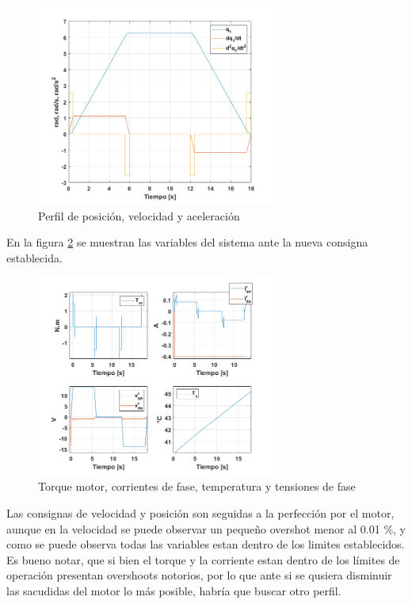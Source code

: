 \documentclass[10pt]{article}
\begin{document}
\begin{itemize}
 \begin{figure}[h!]
	\centering
	\includegraphics[width=0.7\textwidth]{consignasnuevas.png}
	\caption{\label{fig:consignasnuevas}Perfil de posición, velocidad y aceleración}
	\end{figure}

	En la figura \ref{fig:consignanuevapara} se muestran las variables del sistema ante la nueva consigna establecida.

	\begin{figure}[h!]
		\centering
		\includegraphics[width=0.7\textwidth]{consignanuevapara.png}
		\caption{\label{fig:consignanuevapara}Torque motor, corrientes de fase, temperatura y tensiones de fase}
		\end{figure}

	Las consignas de velocidad y posición son seguidas a la perfección por el motor, aunque en la velocidad se puede observar un pequeño overshot menor al 0.01 \%, y como se puede observa todas las variables estan dentro de los limites establecidos. Es bueno notar,
	 que si bien el torque y la corriente estan dentro de los límites de operación presentan overshoots notorios, por lo que ante si se qusiera disminuir las sacudidas del motor lo más posible, habría que buscar otro perfil.
	 

\end{itemize}
\end{document}
